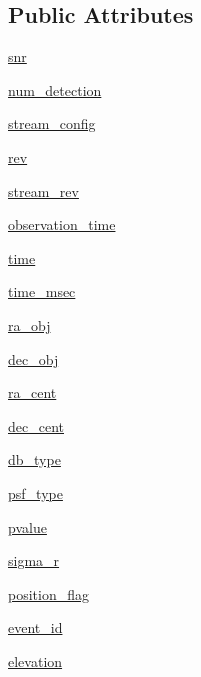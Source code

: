 \subsection*{Public Attributes}
\begin{DoxyCompactItemize}
\item 
\hyperlink{classswift__upload_1_1observation_af99687a759f84b56ed61f2c1b3688dd8}{snr}
\item 
\hyperlink{classswift__upload_1_1observation_ada5a57666f3fadbec980707149d07828}{num\-\_\-detection}
\item 
\hyperlink{classswift__upload_1_1observation_a9596485585ce74140b825512aee37c79}{stream\-\_\-config}
\item 
\hyperlink{classswift__upload_1_1observation_a99450dace25eab8b2c7a3c75262cc524}{rev}
\item 
\hyperlink{classswift__upload_1_1observation_a13b133ec0b17e5a5698be9fc66c012a7}{stream\-\_\-rev}
\item 
\hyperlink{classswift__upload_1_1observation_a4dbc6c0a4f95d314d24df1dfa6a2fc75}{observation\-\_\-time}
\item 
\hyperlink{classswift__upload_1_1observation_a162639895089c8cbac963b1413ae8d6d}{time}
\item 
\hyperlink{classswift__upload_1_1observation_a486373332832fa180cbcc1548b6365a6}{time\-\_\-msec}
\item 
\hyperlink{classswift__upload_1_1observation_ac212201c826046a1d357ebed26ee9b46}{ra\-\_\-obj}
\item 
\hyperlink{classswift__upload_1_1observation_a2ca67fdaf250b67b7ee097b51a271d76}{dec\-\_\-obj}
\item 
\hyperlink{classswift__upload_1_1observation_a79c65fb1e89fc6bcf25f4984dce737ed}{ra\-\_\-cent}
\item 
\hyperlink{classswift__upload_1_1observation_a46af6a7fc09df9b0b4224affe3c1431d}{dec\-\_\-cent}
\item 
\hyperlink{classswift__upload_1_1observation_a6082a4cba3d179951abdb729ae60c196}{db\-\_\-type}
\item 
\hyperlink{classswift__upload_1_1observation_a0116e190475703fb5b3d9b76304b203c}{psf\-\_\-type}
\item 
\hyperlink{classswift__upload_1_1observation_adcc3e0fbb64d16bea5cf6fadf3928309}{pvalue}
\item 
\hyperlink{classswift__upload_1_1observation_a2a3ce10069190fb190c729936469661d}{sigma\-\_\-r}
\item 
\hyperlink{classswift__upload_1_1observation_a30be5bbc348a999af0238626c752fece}{position\-\_\-flag}
\item 
\hyperlink{classswift__upload_1_1observation_ae289f11447bfe0bd135c5a25678a7b02}{event\-\_\-id}
\item 
\hyperlink{classswift__upload_1_1observation_a4c3683d21e549cdc34edf5d3dc5dac03}{elevation}
\end{DoxyCompactItemize}


